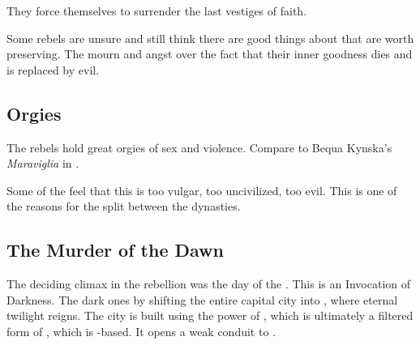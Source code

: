 They force themselves to surrender the last vestiges of faith. 


Some rebels are unsure and still think there are good things about \Merkyrah{} that are worth preserving. 
The mourn and angst over the fact that their inner goodness dies and is replaced by evil. 










\subsection{Orgies}
The rebels hold great orgies of sex and violence. 
Compare to Bequa Kynska's \emph{Maraviglia} in . 

Some of the \KiriathSepher{} feel that this is too vulgar, too uncivilized, too evil. 
This is one of the reasons for the split between the dynasties. 









\subsection{The Murder of the Dawn}
The deciding climax in the rebellion was the day of the . 
This is an Invocation of \Erebean{} Darkness. 
The dark ones  by shifting the entire capital city into \Nyx, where eternal twilight reigns. 
The city is built using the power of , which is ultimately a filtered form of \nieur, which is \Nyx-based.
It opens a weak conduit to \Erebos. 

